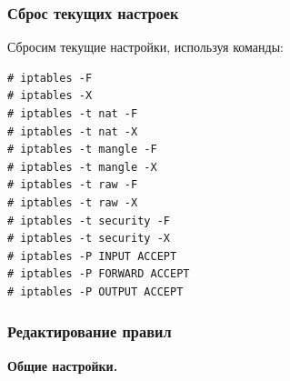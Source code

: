 \documentclass[a4paper]{article}
\begin{document}
		
		\subsubsection{Сброс текущих настроек}
		
		Сбросим текущие настройки, используя команды:	
		\begin{verbatim}
# iptables -F
# iptables -X
# iptables -t nat -F
# iptables -t nat -X
# iptables -t mangle -F
# iptables -t mangle -X
# iptables -t raw -F
# iptables -t raw -X
# iptables -t security -F
# iptables -t security -X
# iptables -P INPUT ACCEPT
# iptables -P FORWARD ACCEPT
# iptables -P OUTPUT ACCEPT
		\end{verbatim}
		
		\subsubsection{Редактирование правил}
		
		\textbf{Общие настройки.}
		
\end{document}
